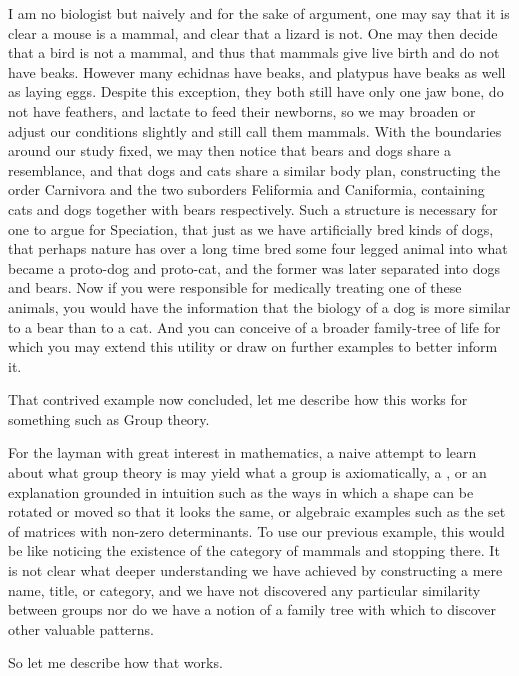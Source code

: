 \documentclass[11pt]{article}
\begin{document}
I am no biologist but naively and for the sake of argument, one may say that it is clear a mouse is a mammal, and clear that a lizard is not. One may then decide that a bird is not a mammal, and thus that mammals give live birth and do not have beaks. However many echidnas have beaks, and platypus have beaks as well as laying eggs. Despite this exception, they both still have only one jaw bone, do not have feathers, and lactate to feed their newborns, so we may broaden or adjust our conditions slightly and still call them mammals. With the boundaries around our study fixed, we may then notice that bears and dogs share a resemblance, and that dogs and cats share a similar body plan, constructing the order Carnivora and the two suborders Feliformia and Caniformia, containing cats and dogs together with bears respectively. Such a structure is necessary for one to argue for Speciation, that just as we have artificially bred kinds of dogs, that perhaps nature has over a long time bred some four legged animal into what became a proto-dog and proto-cat, and the former was later separated into dogs and bears. Now if you were responsible for medically treating one of these animals, you would have the information that the biology of a dog is more similar to a bear than to a cat. And you can conceive of a broader family-tree of life for which you may extend this utility or draw on further examples to better inform it.

That contrived example now concluded, let me describe how this works for something such as Group theory.

For the layman with great interest in mathematics, a naive attempt to learn about what group theory is may yield what a group is axiomatically, a , or an explanation grounded in intuition such as the ways in which a shape can be rotated or moved so that it looks the same, or algebraic examples such as the set of matrices with non-zero determinants. To use our previous example, this would be like noticing the existence of the category of mammals and stopping there. It is not clear what deeper understanding we have achieved by constructing a mere name, title, or category, and we have not discovered any particular similarity between groups nor do we have a notion of a family tree with which to discover other valuable patterns.

So let me describe how that works.
\end{document}
